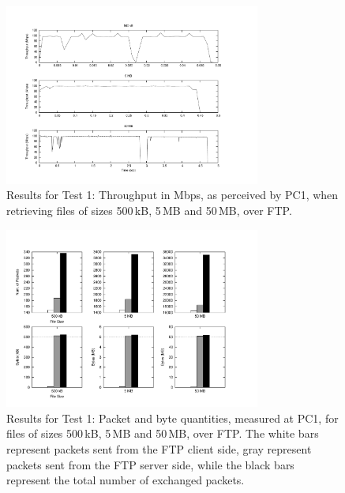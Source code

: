 \begin{figure}[H]

    \centering
    \includegraphics[width=0.75\textwidth]{figures/ftp-thpt.pdf}
    \cprotect\caption{Results for Test 1: Throughput in Mbps, as perceived by 
        PC1, when retrieving files of sizes 500\,kB, 5\,MB and 50\,MB, over 
        FTP.}
    \label{fig:test-1-thpt-ftp}

\end{figure}

\begin{figure}[H]

    \centering
    \includegraphics[width=0.75\textwidth]{figures/tcp.pdf}
    \cprotect\caption{Results for Test 1: Packet and byte quantities, measured 
        at PC1, for files of sizes 500\,kB, 5\,MB and 50\,MB, over 
        FTP. The white bars represent packets sent from the FTP client side, 
        gray represent packets sent from the FTP server side, while the 
        black bars represent the total number of exchanged packets.}
    \label{fig:test-1-packets-bytes-ftp}

\end{figure}

